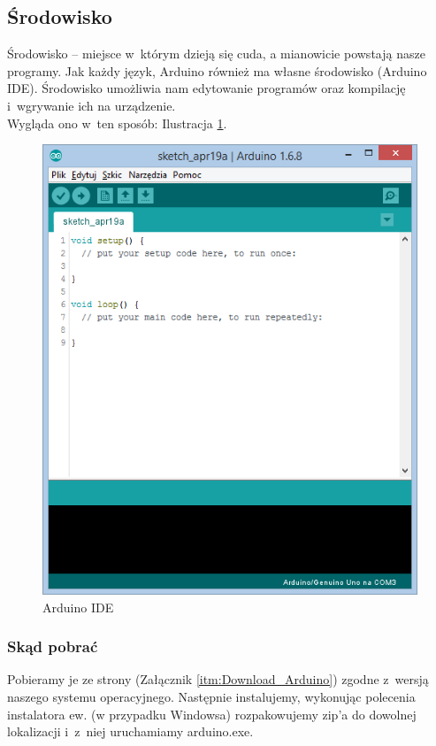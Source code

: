 \documentclass[a4paper,12pt, twoside]{article}
\begin{document}
	\subsection{Środowisko}
	\label{subsec:Srodowisko}
	Środowisko -- miejsce w~którym dzieją się cuda, a mianowicie powstają nasze programy. Jak każdy język, Arduino również ma własne środowisko (Arduino IDE).
	Środowisko umożliwia nam edytowanie programów oraz kompilację i~wgrywanie ich na urządzenie.\\ %
		Wygląda ono w~ten sposób: Ilustracja \ref{fig:IDE}.
	\begin{figure}[h]
			\centering
			\includegraphics[scale=0.7]{ArduinoIDE.png}
			\caption{Arduino IDE}
			\label{fig:IDE}
		\end{figure}
		\FloatBarrier
	\subsubsection{Skąd pobrać}
	Pobieramy je ze strony (Załącznik \ref{itm:Download_Arduino}) zgodne z~wersją naszego systemu operacyjnego. Następnie instalujemy, wykonując polecenia instalatora
	ew. (w przypadku Windowsa) rozpakowujemy zip'a do dowolnej lokalizacji i~z~niej uruchamiamy arduino.exe.
\end{document}

